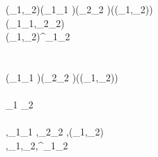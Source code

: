 \begin{hscode}\SaveRestoreHook
{}%
%
%
%
%
\>[3]{}(_{1},_{2})\in {}\mean{\sigma\to \tau}\mathrel{=}\Pi (_{1}\typcolon{}_1 \mean{\sigma})\hsforall \;(_{2}\typcolon{}_2 \mean{\sigma})\;(\typcolon(_{1},_{2})\in {}\mean{\sigma})\<[E]%
\\
\>[3]{}\<[5]%
\>[5]{}(_{1}\;_{1},_{2}\;_{2})\in {}\mean{\tau}{}\<[E]%
\\
\>[3]{}(_{1},_{2})\in {}\mean{\alpha}\mathrel{=}^\alpha\;_{1}\;_{2}{}\<[E]%
\\[\blanklineskip]%
\>[3]{}\mathrel{=}\<[E]%
\\
\>[3]{}\mathrel{=}{}\<[E]%
\\
\>[3]{}\<[5]%
\>[5]{}\lambda (_{1}\typcolon{}_1 \mean{\sigma})\;(_{2}\typcolon{}_2 \mean{\sigma})\;(\typcolon(_{1},_{2})\in {}\mean{\sigma})\to {}\<[E]%
\\
\>[5]{}\<[7]%
\>[7]{}\<[E]%
\\
\>[3]{}\mathrel{=}\;_1 \;_2 \;\<[E]%
\\[\blanklineskip]%
\>[3]{}\mean{\EmptyContext}\mathrel{=}\EmptyContext{}\<[E]%
\\
\>[3]{}\mathrel{=}\mean{\Gamma},_{1}\typcolon{}_1 \mean{\tau},_{2}\typcolon{}_2 \mean{\tau},\typcolon(_{1},_{2})\in {}\mean{\tau}{}\<[E]%
\\
\>[3]{}\mean{\Gamma,\alpha\typcolon\star}\mathrel{=}\mean{\Gamma},\alpha_{1}\typcolon\star,\alpha_{2}\typcolon\star,^\alpha\typcolon\alpha_{1}\to \alpha_{2}\to \lceil \star \rceil{}\<[E]%
\ColumnHook
\end{hscode}\resethooks

